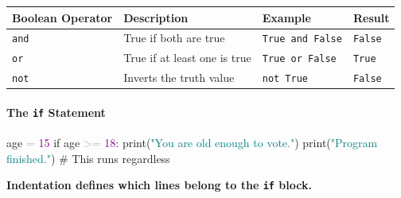 \documentclass[
  justified,
  openright,
]{tufte-book}
\let\subsubsection\paragraph
\let\paragraph\paragraph
\newcommand{\BuiltInTok}[1]{#1}
\newcommand{\CommentTok}[1]{\textcolor{MidGray}{#1}}
\newcommand{\ControlFlowTok}[1]{\textcolor{BrandBlue}{#1}}
\newcommand{\DecValTok}[1]{\textcolor{Purple}{#1}}
\newcommand{\NormalTok}[1]{#1}
\newcommand{\OperatorTok}[1]{\textcolor{DarkGray}{#1}}
\newcommand{\StringTok}[1]{\textcolor{Teal}{#1}}
\newenvironment{Shaded}{%
  \begin{snugshade}
}{%
  \end{snugshade}
}
\let\subsubsection\paragraph
\let\paragraph\paragraph
\begin{document}
{\def\LTcaptype{none} %
\begin{longtable}[]{@{}
  >{\raggedright\arraybackslash}p{}
  >{\raggedright\arraybackslash}p{}
  >{\raggedright\arraybackslash}p{}
  >{\raggedright\arraybackslash}p{}@{}}
\toprule\noalign{}
\begin{minipage}[b]{\linewidth}\raggedright
Boolean Operator
\end{minipage} & \begin{minipage}[b]{\linewidth}\raggedright
Description
\end{minipage} & \begin{minipage}[b]{\linewidth}\raggedright
Example
\end{minipage} & \begin{minipage}[b]{\linewidth}\raggedright
Result
\end{minipage} \\
\midrule\noalign{}
\endhead
\bottomrule\noalign{}
\endlastfoot
\texttt{and} & True if both are true & \texttt{True\ and\ False} &
\texttt{False} \\
\texttt{or} & True if at least one is true & \texttt{True\ or\ False} &
\texttt{True} \\
\texttt{not} & Inverts the truth value & \texttt{not\ True} &
\texttt{False} \\
\end{longtable}
}

\subsubsection{\texorpdfstring{The \texttt{if}
Statement}{The if Statement}}\label{the-if-statement}

\begin{Shaded}
\begin{Highlighting}[]
\NormalTok{age }\OperatorTok{=} \DecValTok{15}
\ControlFlowTok{if}\NormalTok{ age }\OperatorTok{\textgreater{}=} \DecValTok{18}\NormalTok{:}
    \BuiltInTok{print}\NormalTok{(}\StringTok{"You are old enough to vote."}\NormalTok{)}
\BuiltInTok{print}\NormalTok{(}\StringTok{"Program finished."}\NormalTok{)  }\CommentTok{\# This runs regardless}
\end{Highlighting}
\end{Shaded}

\textbf{Indentation defines which lines belong to the \texttt{if}
block.}
\end{document}
